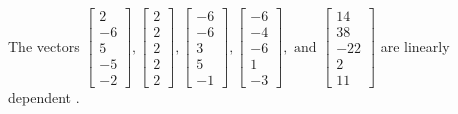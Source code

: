 \begin{exercise}
\begin{exerciseStatement}
  \end{exerciseStatement}
  \begin{exerciseAnswer}
   The vectors \(\left[\begin{array}{r}
2 \\
-6 \\
5 \\
-5 \\
-2
\end{array}\right] , \left[\begin{array}{r}
2 \\
2 \\
2 \\
2 \\
2
\end{array}\right] , \left[\begin{array}{r}
-6 \\
-6 \\
3 \\
5 \\
-1
\end{array}\right] , \left[\begin{array}{r}
-6 \\
-4 \\
-6 \\
1 \\
-3
\end{array}\right] , \text{ and } \left[\begin{array}{r}
14 \\
38 \\
-22 \\
2 \\
11
\end{array}\right]\) are 
  	 linearly dependent  .
  


  \end{exerciseAnswer}
\end{exercise}